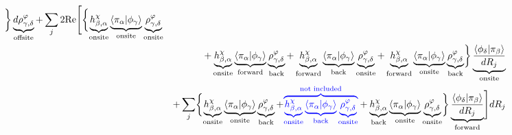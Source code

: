 \documentclass[11pt,a4paper]{report}
\begin{document}
\begin{eqnarray}
\biggr\rbrace
\underbrace{d\rho^{\varphi}_{\gamma,\delta}}_{\text{offsite}}
+
\sum_j2\Re\Biggl[\biggl\lbrace
\underbrace{h^{\chi}_{\beta,\alpha}}_{\text{onsite}}
\underbrace{\langle\pi_\alpha|\phi_\gamma\rangle}_{\text{onsite}}
\underbrace{\rho^{\varphi}_{\gamma,\delta}}_{\text{onsite}}
\nonumber\\
&&+
\underbrace{h^{\chi}_{\beta,\alpha}}_{\text{onsite}}
\underbrace{\langle\pi_\alpha|\phi_\gamma\rangle}_{\text{forward}}
\underbrace{\rho^{\varphi}_{\gamma,\delta}}_{\text{back}}
+
\underbrace{h^{\chi}_{\beta,\alpha}}_{\text{forward}}
\underbrace{\langle\pi_\alpha|\phi_\gamma\rangle}_{\text{back}}
\underbrace{\rho^{\varphi}_{\gamma,\delta}}_{\text{onsite}}
+
\underbrace{h^{\chi}_{\beta,\alpha}}_{\text{forward}}
\underbrace{\langle\pi_\alpha|\phi_\gamma\rangle}_{\text{onsite}}
\underbrace{\rho^{\varphi}_{\gamma,\delta}}_{\text{back}}
%
\biggr\rbrace 
\underbrace{\frac{\langle\phi_\delta|\pi_\beta\rangle}{dR_j}}_{\text{onsite}}
\nonumber\\
&&+
\sum_j\biggl\lbrace
\underbrace{h^{\chi}_{\beta,\alpha}}_{\text{onsite}}
\underbrace{\langle\pi_\alpha|\phi_\gamma\rangle}_{\text{onsite}}
\underbrace{\rho^{\varphi}_{\gamma,\delta}}_{\text{back}}
+
\textcolor{blue}{\overbrace{
\underbrace{h^{\chi}_{\beta,\alpha}}_{\text{onsite}}
\underbrace{\langle\pi_\alpha|\phi_\gamma\rangle}_{\text{back}}
\underbrace{\rho^{\varphi}_{\gamma,\delta}}_{\text{onsite}}
}^{\text{not included}}}
+
\underbrace{h^{\chi}_{\beta,\alpha}}_{\text{back}}
\underbrace{\langle\pi_\alpha|\phi_\gamma\rangle}_{\text{onsite}}
\underbrace{\rho^{\varphi}_{\gamma,\delta}}_{\text{onsite}}
%
\biggr\rbrace 
\underbrace{
\frac{\langle\phi_\delta|\pi_\beta\rangle}{dR_j}
}_{\text{forward}}
\Biggr]
dR_j
\nonumber\\
\end{eqnarray}
\end{document}
